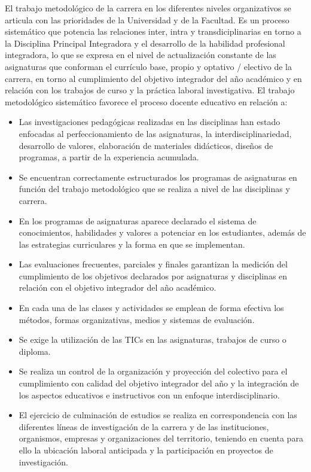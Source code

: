 El trabajo metodológico de la carrera en los diferentes niveles organizativos se articula con las prioridades de la Universidad y de la Facultad. Es un proceso sistemático que potencia las relaciones inter, intra y transdiciplinarias en torno a la Disciplina Principal Integradora y el desarrollo de la habilidad profesional integradora, lo que se expresa en el nivel de actualización constante de las asignaturas que conforman el currículo base, propio y optativo / electivo de la carrera, en torno al cumplimiento del objetivo integrador del año académico y en relación con los trabajos de curso y la práctica laboral investigativa. El trabajo metodológico sistemático favorece el proceso docente educativo en relación a:

\begin{itemize}
	\setlength\itemsep{-0.5em}
	\item Las investigaciones pedagógicas realizadas en las disciplinas han estado enfocadas al perfeccionamiento de las asignaturas, la interdisciplinariedad, desarrollo de valores, elaboración de materiales didácticos, diseños de programas, a partir de la experiencia acumulada.
	\item Se encuentran correctamente estructurados los programas de asignaturas en función del trabajo metodológico que se realiza a nivel de las disciplinas y carrera.
	\item En los programas de asignaturas aparece declarado el sistema de conocimientos, habilidades y valores a potenciar en los estudiantes, además de las estrategias curriculares y la forma en que se implementan.
	\item Las evaluaciones frecuentes, parciales y finales garantizan la medición del cumplimiento de los objetivos declarados por asignaturas y disciplinas en relación con el objetivo integrador del año académico.
	\item En cada una de las clases y actividades se emplean de forma efectiva los métodos, formas organizativas, medios y sistemas de evaluación.
	\item Se exige la utilización de las TICs en las asignaturas, trabajos de curso o diploma.
	\item Se realiza un control de la organización y proyección del colectivo para el cumplimiento con calidad del objetivo integrador del año y la integración de los aspectos educativos e instructivos con un enfoque interdisciplinario.
	\item El ejercicio de culminación de estudios se realiza en correspondencia con las diferentes líneas de investigación de la carrera y de las instituciones, organismos, empresas y organizaciones del territorio, teniendo en cuenta para ello la ubicación laboral anticipada y la participación en proyectos de investigación.
\end{itemize}